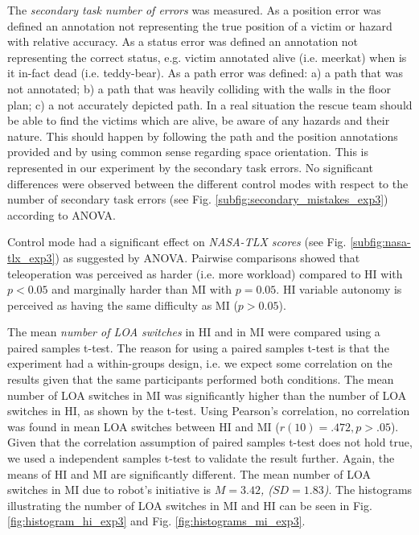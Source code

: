 \documentclass[a4paper,12pt,oneside,openright]{bhamthesis}
\begin{document}
The \textit{secondary task number of errors} was measured. As a position error was defined an annotation not representing the true position of a victim or hazard with relative accuracy. As a status error was defined an annotation not representing the correct status, e.g. victim annotated alive (i.e. meerkat) when is it in-fact dead (i.e. teddy-bear). As a path error was defined: a) a path that was not annotated; b) a path that was heavily colliding with the walls in the floor plan; c) a not accurately depicted path. In a real situation the rescue team should be able to find the victims which are alive, be aware of any hazards and their nature. This should happen by following the path and the position annotations provided and by using common sense regarding space orientation. This is represented in our experiment by the secondary task errors. No significant differences were observed between the different control modes with respect to the number of secondary task errors (see Fig. \ref{subfig:secondary_mistakes_exp3}) according to ANOVA.

Control mode had a significant effect on \textit{NASA-TLX scores} (see Fig. \ref{subfig:nasa-tlx_exp3}) as suggested by ANOVA. Pairwise comparisons showed that teleoperation was perceived as harder (i.e. more workload) compared to HI with $p < 0.05$ and marginally harder than MI with $p = 0.05$. HI variable autonomy is perceived as having the same difficulty as MI ($p > 0.05$). 


The mean \textit{number of LOA switches} in HI and in MI were compared using a paired samples t-test. The reason for using a paired samples t-test is that the experiment had a within-groups design, i.e. we expect some correlation on the results given that the same participants performed both conditions. The mean number of LOA switches in MI was significantly higher than the number of LOA switches in HI, as shown by the t-test. Using Pearson's correlation, no correlation was found in mean LOA switches between HI and MI ($r(10) = .472, p >. 05$). Given that the correlation assumption of paired samples t-test does not hold true, we used a independent samples t-test to validate the result further. Again, the means of HI and MI are significantly different. The mean number of LOA switches in MI due to robot's initiative is \textit{$M = 3.42$, ($SD = 1.83$)}. The histograms illustrating the number of LOA switches in MI and HI can be seen in Fig. \ref{fig:histogram_hi_exp3} and Fig. \ref{fig:histograms_mi_exp3}.
\end{document}

